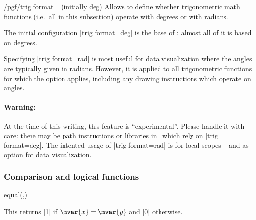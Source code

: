 \begin{key}{/pgf/trig format= (initially deg)}
	Allows to define whether trigonometric math functions (i.e.\ all in this subsection) operate with degrees or with radians.

\begin{codeexample}[]
 \pgfmathresult
\end{codeexample}
\begin{codeexample}[]
 \pgfmathresult
\end{codeexample}
	
	The initial configuration |trig format=deg| is the base of \pgfname: almost all of it is based on degrees. 
	
	Specifying |trig format=rad| is most useful for data visualization where the angles are typically given in radians. However, it is applied to all trigonometric functions for which the option applies, including any drawing instructions which operate on angles.
\begin{codeexample}[]
\end{codeexample}
	
	\paragraph{Warning:} At the time of this writing, this feature is ``experimental''. Please handle it with care: there may be path instructions or libraries in \pgfname\ which rely on |trig format=deg|. The intented usage of |trig format=rad| is for local scopes -- and as option for data visualization.
\end{key}


\subsubsection{Comparison and logical functions}

\label{pgfmath-functions-comparison}

\begin{math-function}{equal(,)}
\mathcommand

	This returns |1| if $\mvar{x}=\mvar{y}$ and |0| otherwise.
	
\begin{codeexample}[]
 \pgfmathresult
\end{codeexample}

\end{math-function}

